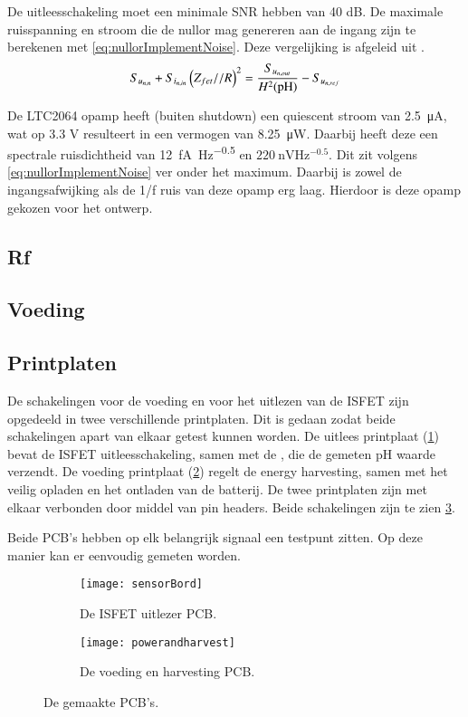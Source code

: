 De uitleesschakeling moet een minimale SNR hebben van 40 dB. De maximale ruisspanning en stroom die de nullor mag genereren aan de ingang zijn te berekenen met \cref{eq:nullorImplementNoise}. Deze vergelijking is afgeleid uit .
\begin{equation} \label{eq:nullorImplementNoise} 
    S_{u_{{n,n}}} + S_{i_{{n,in}}}\left(Z_{fet} // R\right)^2 = \frac{S_{u_{{n,out}}}}{H^2(\mathrm{pH})} - S_{u_{{n,ref}}}
\end{equation}

De LTC2064 opamp heeft (buiten shutdown) een quiescent stroom van \qty{2.5}{\micro\ampere}, wat op 3.3 V resulteert in een vermogen van \qty{8.25}{\micro\watt}. Daarbij heeft deze een spectrale ruisdichtheid van \qty{12}{\femto\ampere\hertz^{-0.5}} en $\qty{220}{\nano\volt\hertz^{-0.5}}$\cite{LTC2064}. Dit zit volgens \cref{eq:nullorImplementNoise} ver onder het maximum. Daarbij is zowel de ingangsafwijking als de 1/f ruis van deze opamp erg laag. Hierdoor is deze opamp gekozen voor het ontwerp.

\subsection{Rf}


\subsection{Voeding}

\subsection{Printplaten}
De schakelingen voor de voeding en voor het uitlezen van de ISFET zijn opgedeeld in twee verschillende printplaten. Dit is gedaan zodat beide schakelingen apart van elkaar getest kunnen worden. De uitlees printplaat (\cref{fig:sensorPCB}) bevat de ISFET uitleesschakeling, samen met de \mcu, die de gemeten pH waarde verzendt. De voeding printplaat (\cref{fig:powerPCB}) regelt de energy harvesting, samen met het veilig opladen en het ontladen van de batterij. De twee printplaten zijn met elkaar verbonden door middel van pin headers. Beide schakelingen zijn te zien \cref{fig:PCBs}.

Beide PCB's hebben op elk belangrijk signaal een testpunt zitten. Op deze manier kan er eenvoudig gemeten worden.


\begin{figure}[ht]
    \centering
    \begin{subfigure}[b]{0.48\textwidth}
        \centering
        \texttt{[image: sensorBord]}
        \caption{De ISFET uitlezer PCB.} 
        \label{fig:sensorPCB}
    \end{subfigure}
    \hfill
    \begin{subfigure}[b]{0.60\textwidth}
        \centering
        \texttt{[image: powerandharvest]}
        \caption{De voeding en harvesting PCB.} 
        \label{fig:powerPCB}
    \end{subfigure}
    \caption{De gemaakte PCB's.}
    \label{fig:PCBs}
\end{figure}